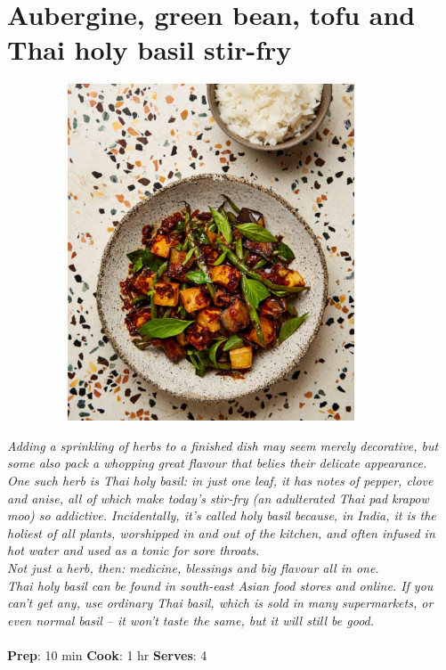 \documentclass{book}
\begin{document}
\section{Aubergine, green bean, tofu and Thai holy basil stir-fry}
\begin{figure}
\centering\includegraphics[width=10cm,height=10cm,keepaspectratio]{Recipe_Pictures/Aubergine,_green_bean,_tofu_and_Thai_holy_basil_stir-fry.png}
\end{figure}
\emph{Adding a sprinkling of herbs to a finished dish may seem merely decorative, but some also pack a whopping great flavour that belies their delicate appearance. \\ 
One such herb is Thai holy basil: in just one leaf, it has notes of pepper, clove and anise, all of which make today’s stir-fry (an adulterated Thai pad krapow moo) so addictive. Incidentally, it’s called holy basil because, in India, it is the holiest of all plants, worshipped in and out of the kitchen, and often infused in hot water and used as a tonic for sore throats.\\ 
Not just a herb, then: medicine, blessings and big flavour all in one.\\ 
Thai holy basil can be found in south-east Asian food stores and online. If you can’t get any, use ordinary Thai basil, which is sold in many supermarkets, or even normal basil – it won’t taste the same, but it will still be good.}\\\\ 
\textbf{Prep}: 10 min
\textbf{Cook}: 1 hr
\textbf{Serves}: 4
\end{document}
